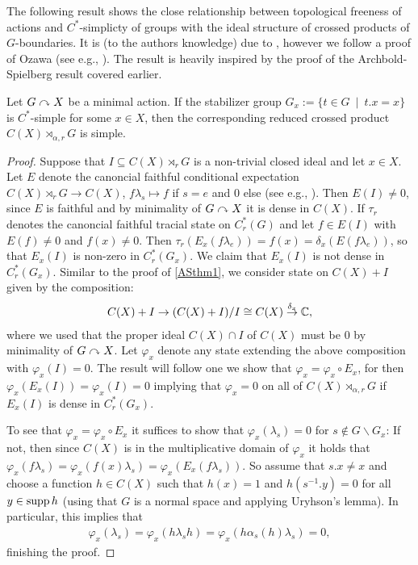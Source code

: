 The following result shows the close relationship between topological freeness of actions and $C^*$-simplicty of groups with the ideal structure of crossed products of $G$-boundaries. It is (to the authors knowledge) due to \cite{breuillard2017c}, however we follow a proof of Ozawa (see e.g., \cite{ozawa2014lecture}). The result is heavily inspired by the proof of the Archbold-Spielberg result covered earlier.
\begin{proposition}
	Let $G \stackrel{}{\curvearrowright} X$ be a minimal action. If the stabilizer group $G_x := \{ t \in G \ \mid \ t.x =x\}$ is $C^*$-simple for some $x \in X$, then the corresponding reduced crossed product $C(X) \rtimes_{\alpha,r} G$ is simple.
	\label{ozawa15pt1}
\end{proposition}
\begin{proof}
	Suppose that $I \subseteq C(X) \rtimes_r G$ is a non-trivial closed ideal and let $x \in X$. Let $E$ denote the canoncial faithful conditional expectation $C(X) \rtimes_r G \to C(X)$, $f \lambda_s \mapsto f$ if $s  = e$ and $0$ else (see e.g., \cite[proposition 4.1.9]{brown2008c}). Then $E(I) \neq 0$, since $E$ is faithful and by minimality of $G \stackrel{}{\curvearrowright} X$ it is dense in $C(X)$. If $\tau_r$ denotes the canoncial faithful tracial state on $C_r^*(G)$ and let $f \in E(I)$ with $E(f) \neq 0$ and $f(x) \neq 0$. Then $\tau_r (E_x(f \lambda_e))= f(x) = \delta_x(E(f\lambda_e))$, so that $E_x(I)$ is non-zero in $C_r^*(G_x)$. We claim that $E_x(I)$ is not dense in $C_r^*(G_x)$. Similar to the proof of \cref{ASthm1}, we consider state on $C(X) + I$ given by the composition:
	\begin{align*}
		C(X) + I \to (C(X)+I)/I \cong C(X) \stackrel {\delta_x} \to \mathbb{C},
	\end{align*}
	where we used that the proper ideal $C(X) \cap I$ of $C(X)$ must be $0$ by minimality of $G \stackrel{}{\curvearrowright} X$. Let $\varphi_x$ denote any state extending the above composition with $\varphi_x(I) =0$. The result will follow one we show that $\varphi_x = \varphi_x \circ E_x$, for then $\varphi_x (E_x(I)) = \varphi_x(I) = 0 $ implying that $\varphi_x= 0$ on all of $C(X) \rtimes_{\alpha,r}G$ if $E_x(I)$ is dense in $C_r^*(G_x)$. 

	To see that $\varphi_x = \varphi_x \circ E_x$ it suffices to show that $\varphi_x (\lambda_s) = 0$ for $s \not \in G \backslash G_x$: If not, then since $C(X)$ is in the multiplicative domain of $\varphi_x$ it holds that $\varphi_x(f \lambda_s) =  \varphi_x( f(x) \lambda_s)  =  \varphi_x (E_x( f\lambda_s))$. So assume that $s.x \neq x$ and choose a function $h \in C(X)$ such that $h(x) = 1$ and $h(s^{-1}.y) = 0$ for all $y \in \operatorname{supp} h$ (using that $G$ is a normal space and applying Uryhson's lemma). In particular, this implies that 
	\begin{align*}
		\varphi_x(\lambda_s) = \varphi_x(h\lambda_sh) = \varphi_x(h \alpha_s(h)\lambda_s)   = 0,
	\end{align*}
	finishing the proof.
\end{proof}
